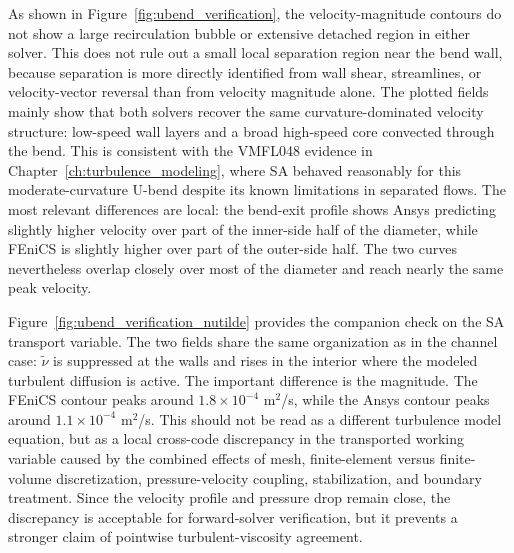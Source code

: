 As shown in Figure~\ref{fig:ubend_verification}, the velocity-magnitude contours do not show a large recirculation bubble or extensive detached region in either solver. This does not rule out a small local separation region near the bend wall, because separation is more directly identified from wall shear, streamlines, or velocity-vector reversal than from velocity magnitude alone. The plotted fields mainly show that both solvers recover the same curvature-dominated velocity structure: low-speed wall layers and a broad high-speed core convected through the bend. This is consistent with the VMFL048 evidence in Chapter~\ref{ch:turbulence_modeling}, where SA behaved reasonably for this moderate-curvature U-bend despite its known limitations in separated flows. The most relevant differences are local: the bend-exit profile shows Ansys predicting slightly higher velocity over part of the inner-side half of the diameter, while FEniCS is slightly higher over part of the outer-side half. The two curves nevertheless overlap closely over most of the diameter and reach nearly the same peak velocity.

Figure~\ref{fig:ubend_verification_nutilde} provides the companion check on the SA transport variable. The two fields share the same organization as in the channel case: $\tilde{\nu}$ is suppressed at the walls and rises in the interior where the modeled turbulent diffusion is active. The important difference is the magnitude. The FEniCS contour peaks around $1.8\times10^{-4}$ m$^2$/s, while the Ansys contour peaks around $1.1\times10^{-4}$ m$^2$/s. This should not be read as a different turbulence model equation, but as a local cross-code discrepancy in the transported working variable caused by the combined effects of mesh, finite-element versus finite-volume discretization, pressure-velocity coupling, stabilization, and boundary treatment. Since the velocity profile and pressure drop remain close, the discrepancy is acceptable for forward-solver verification, but it prevents a stronger claim of pointwise turbulent-viscosity agreement.

